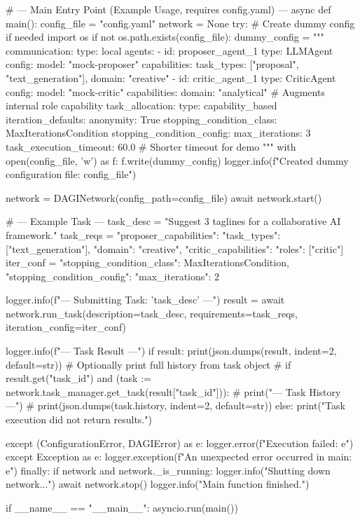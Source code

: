 \documentclass{amsbook}
\theoremstyle{definition}
\theoremstyle{remark}
\numberwithin{equation}{chapter} %
\begin{document}
\begin{python}
# --- Main Entry Point (Example Usage, requires config.yaml) ---
async def main():
    config_file = "config.yaml"
    network = None
    try:
         # Create dummy config if needed
         import os
         if not os.path.exists(config_file):
              dummy_config = """
communication:
  type: local
agents:
  - id: proposer_agent_1
    type: LLMAgent
    config: { model: "mock-proposer" }
    capabilities: { task_types: ["proposal", "text_generation"], domain: "creative" }
  - id: critic_agent_1
    type: CriticAgent
    config: { model: "mock-critic" }
    capabilities: { domain: "analytical" } # Augments internal role capability
task_allocation: { type: capability_based }
iteration_defaults:
  anonymity: True
  stopping_condition_class: MaxIterationsCondition
  stopping_condition_config: { max_iterations: 3 }
task_execution_timeout: 60.0 # Shorter timeout for demo
"""
              with open(config_file, 'w') as f: f.write(dummy_config)
              logger.info(f"Created dummy configuration file: {config_file}")

         network = DAGINetwork(config_path=config_file)
         await network.start()

         # --- Example Task ---
         task_desc = "Suggest 3 taglines for a collaborative AI framework."
         task_reqs = {
             "proposer_capabilities": {"task_types": ["text_generation"], "domain": "creative"},
             "critic_capabilities": {"roles": ["critic"]}
         }
         iter_conf = {"stopping_condition_class": MaxIterationsCondition, "stopping_condition_config": {"max_iterations": 2}}

         logger.info(f"\n--- Submitting Task: '{task_desc}' ---")
         result = await network.run_task(description=task_desc, requirements=task_reqs, iteration_config=iter_conf)

         logger.info(f"\n--- Task Result ---")
         if result:
             print(json.dumps(result, indent=2, default=str))
             # Optionally print full history from task object
             # if result.get("task_id") and (task := network.task_manager.get_task(result["task_id"])):
             #     print("\n--- Task History ---")
             #     print(json.dumps(task.history, indent=2, default=str))
         else: print("Task execution did not return results.")

    except (ConfigurationError, DAGIError) as e: logger.error(f"Execution failed: {e}")
    except Exception as e: logger.exception(f"An unexpected error occurred in main: {e}")
    finally:
        if network and network._is_running:
             logger.info("Shutting down network...")
             await network.stop()
        logger.info("Main function finished.")

if __name__ == "__main__":
    asyncio.run(main())
 \end{python}

\backmatter %

% 
% 

\end{document}
